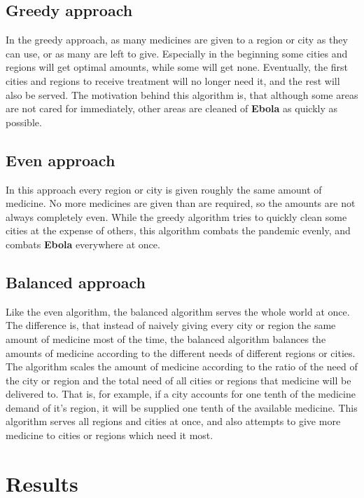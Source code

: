 \documentclass[12pt]{article}
\newcommand{\E}[0]{\textbf{Ebola }}
\begin{document}
\subsection{Greedy approach}

In the greedy approach, as many medicines are given to a region or city as they can use, or as many are left to give. Especially in the beginning some cities and regions will get optimal amounts, while some will get none. Eventually, the first cities and regions to receive treatment will no longer need it, and the rest will also be served. The motivation behind this algorithm is, that although some areas are not cared for immediately, other areas are cleaned of \E as quickly as possible.

\subsection{Even approach}

In this approach every region or city is given roughly the same amount of medicine. No more medicines are given than are required, so the amounts are not always completely even. While the greedy algorithm tries to quickly clean some cities at the expense of others, this algorithm combats the pandemic evenly, and combats \E everywhere at once.

\subsection{Balanced approach}

Like the even algorithm, the balanced algorithm serves the whole world at once. The difference is, that instead of naively giving every city or region the same amount of medicine most of the time, the balanced algorithm balances the amounts of medicine according to the different needs of different regions or cities. The algorithm scales the amount of medicine according to the ratio of the need of the city or region and the total need of all cities or regions that medicine will be delivered to. That is, for example, if a city accounts for one tenth of the medicine demand of it's region, it will be supplied one tenth of the available medicine. This algorithm serves all regions and cities at once, and also attempts to give more medicine to cities or regions which need it most.


\newpage
\section{Results}
\end{document}
